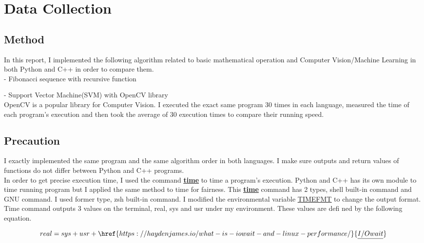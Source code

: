 \documentclass[11pt, a4paper]{article}
\begin{document}
\section{Data Collection}
\subsection{Method}
In this report, I implemented the following algorithm related to basic mathematical operation and Computer Vision/Machine Learning in both Python and C++ in order to compare them.\\

- Fibonacci sequence with recursive function 



- Support Vector Machine(SVM) with OpenCV library\\

OpenCV is a popular library for Computer Vision. I executed the exact same program 30 times in each language, measured the time of each program's execution and then took the average of 30 execution times to compare their running speed.

\subsection{Precaution}
I exactly implemented the same program and the same algorithm order in both languages. I make sure outputs and return values of functions do not differ between Python and C++ programs.\\

In order to get precise execution time, I used the command \href{https://en.wikipedia.org/wiki/Time_(Unix)}{\underline{\bf{time}}} to time a program's execution. Python and C++ has its own module to time running program but I applied the same method to time for fairness. This \href{https://linuxize.com/post/linux-time-command/}{\underline{\bf{time}}} command has 2 types, shell built-in command and GNU command. I used former type, zsh built-in command. I modified the environmental variable \href{https://unix.stackexchange.com/questions/453338/how-to-get-execution-millisecond-time-of-a-command-in-zsh}{\underline{TIMEFMT}} to change the output format. Time command outputs 3 values on the terminal, real, sys  and usr under my environment. These values are defi	ned by the following equation. 

\begin{equation}
real = sys + usr + \href{https://haydenjames.io/what-is-iowait-and-linux-performance/}{\underline{I/Owait}}
\end{equation}
\end{document}
